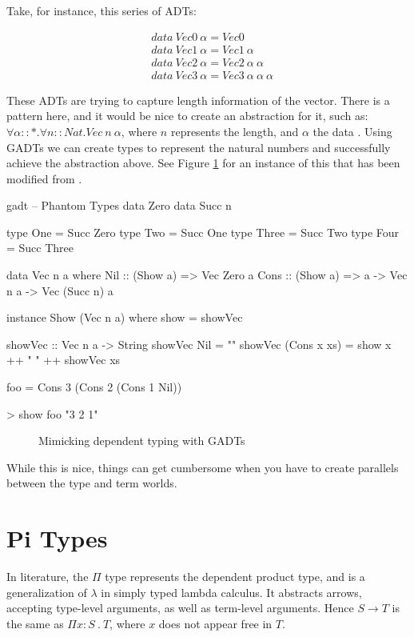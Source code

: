 Take, for instance, this series of ADTs:
\begin{spacing}{1.3}
\begin{equation*}
  \begin{aligned}
  & data\ Vec0\ \alpha = Vec0 \\
  & data\ Vec1\ \alpha = Vec1\ \alpha \\
  & data\ Vec2\ \alpha = Vec2\ \alpha\ \alpha \\
  & data\ Vec3\ \alpha = Vec3\ \alpha\ \alpha\ \alpha
  \end{aligned}
\end{equation*}
\end{spacing}

These ADTs are trying to capture length information of the vector. There is a pattern here, and it would be nice to create an abstraction for it, such as: $\forall \alpha :: \ast.\forall n :: Nat.Vec\ n\ \alpha $, where $n$ represents the length, and $\alpha $ the data \cite{lambdaPi}. Using GADTs we can create types to represent the natural numbers and successfully achieve the abstraction above. See Figure \ref{fig:gadt} for an instance of this that has been modified from \cite{vectors}.

\begin{SaveVerbatim}{gadt}
-- Phantom Types
data Zero
data Succ n

type One   = Succ Zero
type Two   = Succ One
type Three = Succ Two
type Four  = Succ Three

data Vec n a where
  Nil  :: (Show a) =>                 Vec Zero a
  Cons :: (Show a) => a -> Vec n a -> Vec (Succ n) a

instance Show (Vec n a) where show = showVec

showVec :: Vec n a -> String
showVec Nil = ""
showVec (Cons x xs) = show x ++ " " ++ showVec xs

foo = Cons 3 (Cons 2 (Cons 1 Nil))

> show foo
"3 2 1"
\end{SaveVerbatim}
\begin{figure}
  \caption{Mimicking dependent typing with GADTs}
  \label{fig:gadt}
\end{figure}


While this is nice, things can get cumbersome when you have to create parallels between the type and term worlds.

\section{Pi Types}
In literature, the $\Pi $ type represents the dependent product type, and is a generalization of $\lambda $ in simply typed lambda calculus. It abstracts arrows, accepting type-level arguments, as well as term-level arguments. Hence $S \rightarrow T  $ is the same as $\Pi x : S\ .\ T $, where $x$ does not appear free in $T$.


